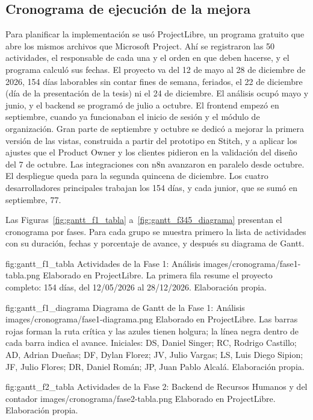 \subsection{Cronograma de ejecución de la mejora}

Para planificar la implementación se usó ProjectLibre, un programa gratuito que abre los mismos archivos que Microsoft Project.
Ahí se registraron las 50 actividades, el responsable de cada una y el orden en que deben hacerse, y el programa calculó sus fechas.
El proyecto va del 12 de mayo al 28 de diciembre de 2026, 154 días laborables sin contar fines de semana, feriados, el 22 de diciembre (día de la presentación de la tesis) ni el 24 de diciembre.
El análisis ocupó mayo y junio, y el backend se programó de julio a octubre.
El frontend empezó en septiembre, cuando ya funcionaban el inicio de sesión y el módulo de organización.
Gran parte de septiembre y octubre se dedicó a mejorar la primera versión de las vistas, construida a partir del prototipo en Stitch,
y a aplicar los ajustes que el Product Owner y los clientes pidieron en la validación del diseño del 7 de octubre.
Las integraciones con n8n avanzaron en paralelo desde octubre.
El despliegue queda para la segunda quincena de diciembre.
Los cuatro desarrolladores principales trabajan los 154 días, y cada junior, que se sumó en septiembre, 77.

Las Figuras~\ref{fig:gantt_f1_tabla} a~\ref{fig:gantt_f345_diagrama} presentan el cronograma por fases.
Para cada grupo se muestra primero la lista de actividades con su duración, fechas y porcentaje de avance, y después su diagrama de Gantt.

\figuraEnTexto
    {fig:gantt_f1_tabla}
    {Actividades de la Fase 1: Análisis}
    {images/cronograma/fase1-tabla.png}
    {Elaborado en ProjectLibre. La primera fila resume el proyecto completo: 154 días, del 12/05/2026 al 28/12/2026. Elaboración propia.}

\figuraEnTexto
    {fig:gantt_f1_diagrama}
    {Diagrama de Gantt de la Fase 1: Análisis}
    {images/cronograma/fase1-diagrama.png}
    {Elaborado en ProjectLibre. Las barras rojas forman la ruta crítica y las azules tienen holgura; la línea negra dentro de cada barra indica el avance.
    Iniciales: DS, Daniel Singer; RC, Rodrigo Castillo; AD, Adrian Dueñas; DF, Dylan Florez; JV, Julio Vargas; LS, Luis Diego Sipion; JF, Julio Flores; DR, Daniel Román; JP, Juan Pablo Alcalá.
    Elaboración propia.}

\figuraEnTexto
    {fig:gantt_f2_tabla}
    {Actividades de la Fase 2: Backend de Recursos Humanos y del contador}
    {images/cronograma/fase2-tabla.png}
    {Elaborado en ProjectLibre. Elaboración propia.}

